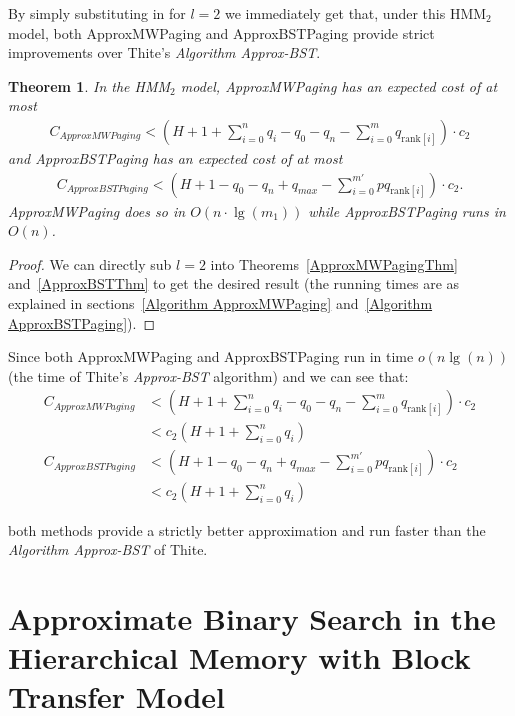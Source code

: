 \documentclass[letterpaper,12pt,titlepage,oneside,final]{book}
\theoremstyle{plain}
\newtheorem{thm}{Theorem}[section]
\begin{document}
By simply substituting in for $l=2$ we immediately get that, under this HMM$_2$ model, both ApproxMWPaging and ApproxBSTPaging provide strict improvements over Thite's \textit{Algorithm Approx-BST}. 

\begin{thm}
In the HMM$_2$ model, ApproxMWPaging has an expected cost of at most \\
\begin{align*}
C_{ApproxMWPaging} < (H + 1 + \sum_{i=0}^n q_i - q_0 - q_n - \sum_{i=0}^m q_{\text{rank}[i]}) \cdot  c_2
\end{align*}
and ApproxBSTPaging has an expected cost of at most
\begin{align*}
C_{ApproxBSTPaging} <  (H + 1 - q_0 - q_n + q_{max} - \sum_{i=0}^{m'} pq_{\text{rank}[i]})\cdot c_2.
\end{align*}
ApproxMWPaging does so in $O(n\cdot \lg(m_1))$ while ApproxBSTPaging runs in $O(n)$.
\end{thm}

\begin{proof}
We can directly sub $l=2$ into Theorems~\ref{ApproxMWPagingThm} and~\ref{ApproxBSTThm} to get the desired result (the running times are as explained in sections~\ref{Algorithm ApproxMWPaging} and~\ref{Algorithm ApproxBSTPaging}).
\end{proof}

Since both ApproxMWPaging and ApproxBSTPaging run in time $o(n\lg(n))$ (the time of Thite's \textit{Approx-BST} algorithm) and we can see that:\\
\begin{align*}
C_{ApproxMWPaging} &< (H + 1 + \sum_{i=0}^n q_i - q_0 - q_n - \sum_{i=0}^m q_{\text{rank}[i]}) \cdot  c_2 \\
&< c_2(H+1+\sum_{i=0}^{n}q_i) \\
 C_{ApproxBSTPaging} &< (H + 1 - q_0 - q_n + q_{max} - \sum_{i=0}^{m'} pq_{\text{rank}[i]})\cdot c_2 \\
 &< c_2(H+1+\sum_{i=0}^{n}q_i)
 \end{align*}

both methods provide a strictly better approximation and run faster than the \textit{Algorithm Approx-BST} of Thite.



\iffalse

\chapter{Approximate Binary Search in the Hierarchical Memory with Block Transfer Model}\label{Approximate Binary Search in the Hierarchical Memory with Block Transfer Model}
\end{document}
